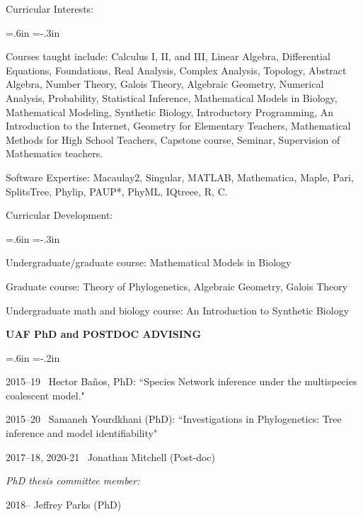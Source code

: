 \documentclass[10pt]{report}
\begin{document}
{{\mbox{}
}

\newpage

{\sc Curricular Interests:}

{ \leftskip=.6in \parindent=-.3in  \parskip=3pt

Courses taught include: Calculus I, II, and III, Linear Algebra,
Differential Equations, Foundations, Real Analysis, Complex
Analysis, Topology, Abstract Algebra, Number Theory, Galois Theory, Algebraic
Geometry, Numerical Analysis,
Probability, Statistical Inference, Mathematical Models in Biology,
Mathematical Modeling, Synthetic Biology, Introductory Programming, An Introduction to
the Internet, Geometry for Elementary Teachers, Mathematical Methods
for High School Teachers, Capstone course, Seminar, Supervision of
Mathematics teachers.

Software Expertise: Macaulay2, Singular, MATLAB, Mathematica, Maple,
Pari, SplitsTree, Phylip, PAUP*, PhyML, IQtreee, R, C.

}

{\sc Curricular Development:}

{ \leftskip=.6in \parindent=-.3in  \parskip=3pt

Undergraduate/graduate course:  Mathematical Models in Biology

Graduate course:  Theory of Phylogenetics, Algebraic Geometry, Galois Theory

Undergraduate math and biology course:  An Introduction to Synthetic Biology

\mbox{}
}

}


{\bf UAF PhD  and POSTDOC ADVISING}

\medskip

{\leftskip=.6in \parindent=-.2in  \parskip=3pt

2015--19 \, Hector Ba\~nos, PhD: ``Species Network inference under the multispecies coalescent
model."

2015--20  \, Samaneh Yourdkhani (PhD):  ``Investigations in Phylogenetics:  Tree inference and model identifiability"

2017--18, 2020-21 \, Jonathan Mitchell (Post-doc)

{
\smallskip
{\sl PhD thesis committee member:}

2018--\phantom{20} Jeffrey Parks (PhD)
}{}

}
\end{document}
